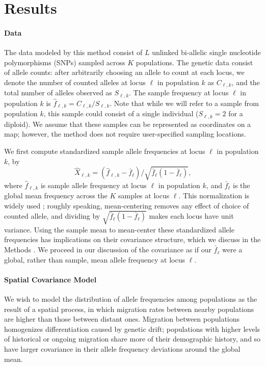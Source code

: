 \documentclass[12pt]{article}
\newcommand{\gc}[1]{{\it\color{blue}{(#1)}}}
\begin{document}
\section*{Results}

\paragraph{Data}

The data modeled by this method consist of $L$ unlinked bi-allelic single nucleotide polymorphisms (SNPs) sampled across $K$ populations.
The genetic data consist of allele counts: after arbitrarily choosing an allele to count at each locus, 
we denote the number of counted alleles at locus $\ell$ in population $k$ as $C_{\ell,k}$,
and the total number of alleles observed as $S_{\ell,k}$.
The sample frequency at locus $\ell$ in population $k$ is $\hat{f}_{\ell,k} = C_{\ell,k}/S_{\ell,k}$.  
Note that while we will refer to a sample from population $k$, this sample could consist of a single individual ($S_{\ell,k}=2$ for a diploid).
We assume that these samples can be represented as coordinates on a map; however, the method does not require user-specified sampling locations.

We first compute standardized sample allele frequencies at locus $\ell$ in population $k$, by
\begin{equation}
  \label{eq:standardized_sample_freqs}
  \hat{X}_{\ell,k} = (\hat{f}_{\ell,k}  - \bar{f}_{\ell})/\sqrt{\bar{f}_{\ell}(1-\bar{f}_{\ell})}\text{,}
\end{equation}
where $\hat{f}_{\ell,k}$ is sample allele frequency at locus $\ell$ in population $k$, and $\bar{f}_{\ell}$ is the global mean frequency across the $K$ samples at locus $\ell$.  
This normalization is widely used \citep[e.g.][]{nicholson2002,Patterson2006};
roughly speaking, mean-centering removes any effect of choice of counted allele,
and dividing by $\sqrt{\bar{f}_{\ell}(1-\bar{f}_{\ell})}$ makes each locus have unit variance.
Using the sample mean to mean-center these standardized allele frequencies has implications on their covariance structure, which we discuss in the Methods \gc{Section XXX}.  
We proceed in our discussion of the covariance as if our $\bar{f}_{\ell}$ were a global, rather than sample, mean allele frequency at locus $\ell$.

\paragraph{Spatial Covariance Model}
We wish to model the distribution of allele frequencies among populations as the result of a spatial process, in which migration rates between nearby populations are higher than those between distant ones.  
Migration between populations homogenizes differentiation caused by genetic drift; 
populations with higher levels of historical or ongoing migration share more of their demographic history,
and so have larger covariance in their allele frequency deviations around the global mean.
\end{document}
